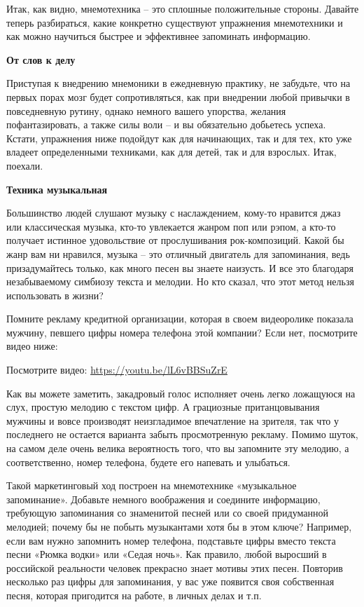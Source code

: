 Итак, как видно, мнемотехника – это сплошные положительные стороны. Давайте теперь разбираться, какие конкретно существуют упражнения мнемотехники и как можно научиться быстрее и эффективнее запоминать информацию.

\textbf{От слов к делу}

Приступая к внедрению мнемоники в ежедневную практику, не забудьте, что на первых порах мозг будет сопротивляться, как при внедрении любой привычки в повседневную рутину, однако немного вашего упорства, желания пофантазировать, а также силы воли – и вы обязательно добьетесь успеха. Кстати, упражнения ниже подойдут как для начинающих, так и для тех, кто уже владеет определенными техниками, как для детей, так и для взрослых. Итак, поехали.

\textbf{Техника музыкальная}

Большинство людей слушают музыку с наслаждением, кому-то нравится джаз или классическая музыка, кто-то увлекается жанром поп или рэпом, а кто-то получает истинное удовольствие от прослушивания рок-композиций. Какой бы жанр вам ни нравился, музыка – это отличный двигатель для запоминания, ведь призадумайтесь только, как много песен вы знаете наизусть. И все это благодаря незабываемому симбиозу текста и мелодии. Но кто сказал, что этот метод нельзя использовать в жизни?

Помните рекламу кредитной организации, которая в своем видеоролике показала мужчину, певшего цифры номера телефона этой компании? Если нет, посмотрите видео ниже:

\begin{fancyquotes}
    Посмотрите видео: \url{https://youtu.be/lL6vBBSuZrE}
\end{fancyquotes}

Как вы можете заметить, закадровый голос исполняет очень легко ложащуюся на слух, простую мелодию с текстом цифр. А грациозные пританцовывания мужчины и вовсе производят неизгладимое впечатление на зрителя, так что у последнего не остается варианта забыть просмотренную рекламу. Помимо шуток, на самом деле очень велика вероятность того, что вы запомните эту мелодию, а соответственно, номер телефона, будете его напевать и улыбаться.

Такой маркетинговый ход построен на мнемотехнике «музыкальное запоминание». Добавьте немного воображения и соедините информацию, требующую запоминания со знаменитой песней или со своей придуманной мелодией; почему бы не побыть музыкантами хотя бы в этом ключе? Например, если вам нужно запомнить номер телефона, подставьте цифры вместо текста песни «Рюмка водки» или «Седая ночь». Как правило, любой выросший в российской реальности человек прекрасно знает мотивы этих песен. Повторив несколько раз цифры для запоминания, у вас уже появится своя собственная песня, которая пригодится на работе, в личных делах и т.п.

